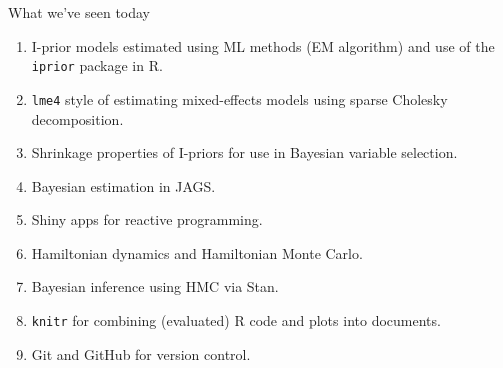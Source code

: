 \documentclass{beamer}\usepackage[]{graphicx}\usepackage[]{color}
\begin{document}
\begin{frame}{What we've seen today}
	\begin{enumerate}[1]
		\item I-prior models estimated using ML methods (EM algorithm) and use of the \texttt{iprior} package in R.
		\item \texttt{lme4} style of estimating mixed-effects models using sparse Cholesky decomposition.
		\item Shrinkage properties of I-priors for use in Bayesian variable selection.
		\item Bayesian estimation in JAGS.
		\item Shiny apps for reactive programming.
		\item Hamiltonian dynamics and Hamiltonian Monte Carlo.
		\item Bayesian inference using HMC via Stan.
		\item \texttt{knitr} for combining (evaluated) R code and plots into documents.
		\item Git and GitHub for version control.
	\end{enumerate}
\end{frame}
\end{document}
